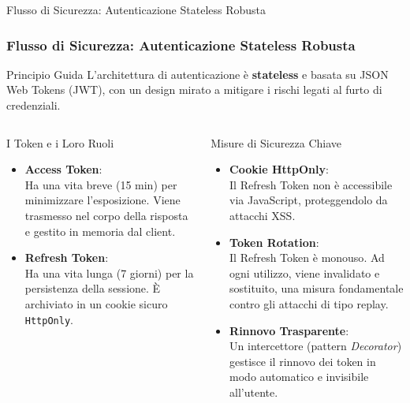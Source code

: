 \documentclass[8pt]{beamer}
\begin{document}
\begin{frame}{Flusso di Sicurezza: Autenticazione Stateless Robusta}
  \frametitle{Flusso di Sicurezza: Autenticazione Stateless Robusta}

  \begin{block}{Principio Guida}
    L'architettura di autenticazione è \textbf{stateless} e basata su JSON Web Tokens (JWT), con un design mirato a mitigare i rischi legati al furto di credenziali.
  \end{block}

  \begin{columns}[T]
    \begin{exampleblock}{I Token e i Loro Ruoli}
      \begin{itemize}
        \item \textbf{Access Token}:\\Ha una vita breve (15 min) per minimizzare l'esposizione. Viene trasmesso nel corpo della risposta e gestito in memoria dal client.

        \item \textbf{Refresh Token}:\\Ha una vita lunga (7 giorni) per la persistenza della sessione. È archiviato in un cookie sicuro \texttt{HttpOnly}.
      \end{itemize}
    \end{exampleblock}

    \begin{alertblock}{Misure di Sicurezza Chiave}
      \begin{itemize}
        \item \textbf{Cookie HttpOnly}:\\Il Refresh Token non è accessibile via JavaScript, proteggendolo da attacchi XSS.

        \item \textbf{Token Rotation}:\\Il Refresh Token è \alert{monouso}. Ad ogni utilizzo, viene invalidato e sostituito, una misura fondamentale contro gli attacchi di tipo replay.

        \item \textbf{Rinnovo Trasparente}:\\Un intercettore (pattern \textit{Decorator}) gestisce il rinnovo dei token in modo automatico e invisibile all'utente.
      \end{itemize}
    \end{alertblock}
  \end{columns}
\end{frame}
\end{document}
